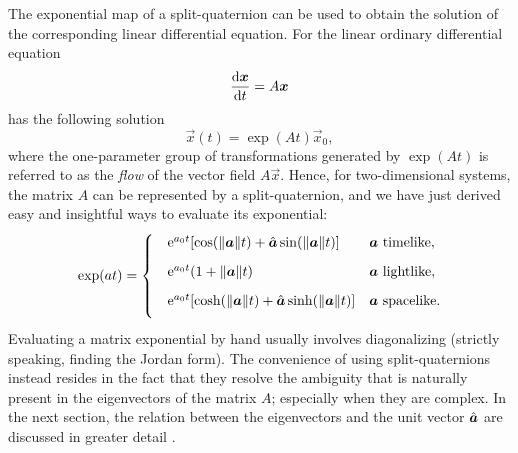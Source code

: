 The exponential map of a split-quaternion can be used to obtain the solution of the corresponding linear differential equation. For the linear ordinary differential equation
\begin{equation}
     \dv{\vec{x}}{t} = A\vec{x}
\end{equation}
has the following solution \cite{Arnold1984}
\begin{equation}
     \vec{x}(t) = \exp(At)\vec{x}_0,
\end{equation}
where the one-parameter group of transformations generated by \(\exp(A t)\) is referred to as the \emph{flow} of the vector field \(A\vec{x}\). Hence, for two-dimensional systems, the matrix \(A\) can be represented by a split-quaternion, and we have just derived easy and insightful ways to evaluate its exponential: 
\begin{equation}
    \exp(a t) = 
    \begin{cases}
        \phantom \quad \ec^{a_0 t}\qty[\cos(\norm{\vec{a}} t) + \uvec{a}\sin(\norm{\vec{a}} t)] & \vec{a} \text{ timelike}, \\[1.5ex]
        \phantom \quad \ec^{a_0 t}\qty(1 + \norm{\vec{a}}t ) & \vec{a} \text{ lightlike}, \\[1.5ex]
        \phantom \quad \ec^{a_0 t}\qty[\cosh(\norm{\vec{a}} t) + \uvec{a}\sinh(\norm{\vec{a}} t)] & \vec{a} \text{ spacelike}. \\[1.5ex]
    \end{cases}
    \label{ssec:system_solution}
\end{equation}
Evaluating a matrix exponential by hand usually involves diagonalizing (strictly speaking, finding the Jordan form). The convenience of using split-quaternions instead resides in the fact that they resolve the ambiguity that is naturally present in the eigenvectors of the matrix \(A\); especially when they are complex. In the next section, the relation between the eigenvectors and the unit vector \(\uvec{a}\) are discussed in greater detail \cite{Moler2003}.
